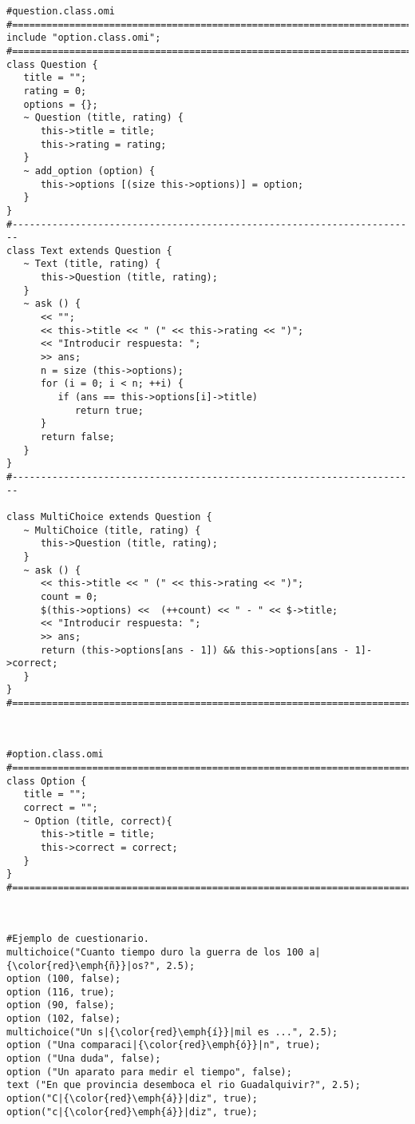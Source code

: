 \begin{lstlisting}[language=omi]
#question.class.omi
#=======================================================================
include "option.class.omi";
#=======================================================================
class Question {
   title = "";
   rating = 0;
   options = {};
   ~ Question (title, rating) {
      this->title = title;
      this->rating = rating;
   }
   ~ add_option (option) {
      this->options [(size this->options)] = option;
   }
}
#-----------------------------------------------------------------------
class Text extends Question {
   ~ Text (title, rating) {
      this->Question (title, rating);
   }
   ~ ask () {
      << "";
      << this->title << " (" << this->rating << ")";
      << "Introducir respuesta: ";
      >> ans;
      n = size (this->options);
      for (i = 0; i < n; ++i) {
         if (ans == this->options[i]->title)
            return true;
      }
      return false;
   }
}
#-----------------------------------------------------------------------

class MultiChoice extends Question {
   ~ MultiChoice (title, rating) {
      this->Question (title, rating);
   }
   ~ ask () {
      << this->title << " (" << this->rating << ")";
      count = 0;
      $(this->options) <<  (++count) << " - " << $->title;
      << "Introducir respuesta: ";
      >> ans;
      return (this->options[ans - 1]) && this->options[ans - 1]->correct;
   }
}
#=======================================================================
\end{lstlisting}
\hfill\\

\begin{lstlisting}[language=omi]
#option.class.omi
#=======================================================================
class Option {
   title = "";
   correct = "";
   ~ Option (title, correct){
      this->title = title;
      this->correct = correct;
   }
}
#=======================================================================
\end{lstlisting}
\hfill\\

\begin{lstlisting}[language=omi]
#Ejemplo de cuestionario.
multichoice("Cuanto tiempo duro la guerra de los 100 a|{\color{red}\emph{ñ}}|os?", 2.5);
option (100, false);
option (116, true);
option (90, false);
option (102, false);
multichoice("Un s|{\color{red}\emph{í}}|mil es ...", 2.5);
option ("Una comparaci|{\color{red}\emph{ó}}|n", true);
option ("Una duda", false);
option ("Un aparato para medir el tiempo", false);
text ("En que provincia desemboca el rio Guadalquivir?", 2.5);
option("C|{\color{red}\emph{á}}|diz", true);
option("c|{\color{red}\emph{á}}|diz", true);
\end{lstlisting}
\hfill\\

